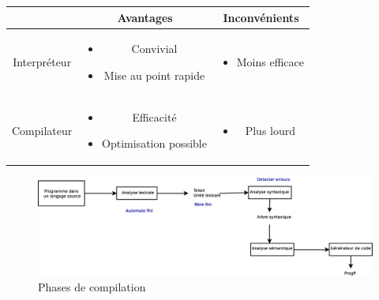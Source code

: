 \documentclass[12pt,a4paper,openany]{book}
\begin{document}
	\begin{tabular}{c||c|c}
		&Avantages&Inconvénients\\
		\hline
		Interpréteur &
		\begin{minipage}{0.3\textwidth}
			\begin{itemize}
				\item Convivial
				\item Mise au point rapide
			\end{itemize}
		\end{minipage}&
		\begin{minipage}{0.3\textwidth}
			\begin{itemize}
				\item Moins efficace
			\end{itemize}
		\end{minipage}
		\\
		\hline
		Compilateur&
		\begin{minipage}{0.3\textwidth}
			\begin{itemize}
				\item Efficacité
				\item Optimisation possible
			\end{itemize}
		\end{minipage}&
		\begin{minipage}{0.3\textwidth}
			\begin{itemize}
				\item Plus lourd
			\end{itemize}
		\end{minipage}
	\end{tabular}

	\begin{figure}[H]
		\centering
		\includegraphics[width=19cm]{Diagramme3.eps}
		\caption{Phases de compilation}
	\end{figure}
\end{document}
